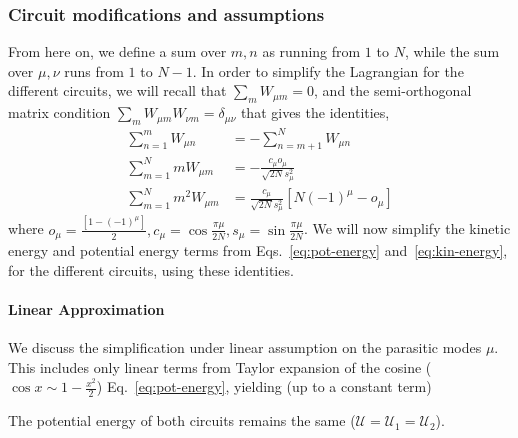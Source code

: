 \documentclass[%
reprint,
superscriptaddress,
 amsmath,amssymb,
 aps,
 prx,
longbibliography,
floatfix,
]{revtex4-2}
\begin{document}
\subsubsection{Circuit modifications and assumptions}
From here on, we define a sum over $m,n$ as running from $1$ to $N$, while the sum over $\mu,\nu$ runs from $1$ to $N-1$. In order to simplify the Lagrangian for the different circuits, we will recall that $\sum_m W_{\mu m}=0$, and the semi-orthogonal matrix condition $\sum_m W_{\mu m}W_{\nu m}=\delta_{\mu\nu}$ that gives the identities,
\begin{align}
 \sum_{n=1}^m W_{\mu n}&=-\sum_{n=m+1}^N W_{\mu n}\\
 \sum_{m=1}^N mW_{\mu m}&=-\frac{c_\mu o_{\mu}}{\sqrt{2N}s_\mu^2}\\
 \sum_{m=1}^N m^2W_{\mu m}&=\frac{c_\mu}{\sqrt{2N}s_\mu^2}[N(-1)^\mu-o_\mu]
\end{align}
where $o_\mu=\frac{[1-(-1)^\mu]}{2},c_\mu=\cos{\frac{\pi\mu}{2N}}, s_\mu=\sin{\frac{\pi\mu}{2N}}$. We will now simplify the kinetic energy and potential energy terms from Eqs.~\ref{eq:pot-energy} and~\ref{eq:kin-energy}, for the different circuits, using these identities.
\paragraph{Linear Approximation}
We discuss the simplification under linear assumption on the parasitic modes $\mu$. This includes only linear terms from Taylor expansion of the cosine ($\cos{x}\sim 1-\frac{x^2}{2}$) Eq.~\ref{eq:pot-energy}, yielding (up to a constant term)

 The potential energy of both circuits remains the same ($\mathcal{U}=\mathcal{U}_1=\mathcal{U}_2$). 
\end{document}
